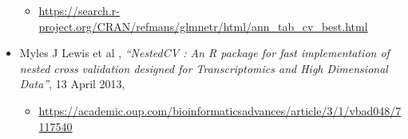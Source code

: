 \documentclass[
]{article}
\providecommand{\tightlist}{%
  \setlength{\itemsep}{0pt}\setlength{\parskip}{0pt}}
\begin{document}
\begin{itemize}
  \begin{itemize}
  \tightlist
  \item
    \url{https://search.r-project.org/CRAN/refmans/glmnetr/html/ann_tab_cv_best.html}
  \end{itemize}
\item
  Myles J Lewis et al , \emph{``NestedCV : An R package for fast
  implementation of nested cross validation designed for Transcriptomics
  and High Dimensional Data''}, 13 April 2013,

  \begin{itemize}
  \tightlist
  \item
    \url{https://academic.oup.com/bioinformaticsadvances/article/3/1/vbad048/7117540}
  \end{itemize}
\end{itemize}
\end{document}
